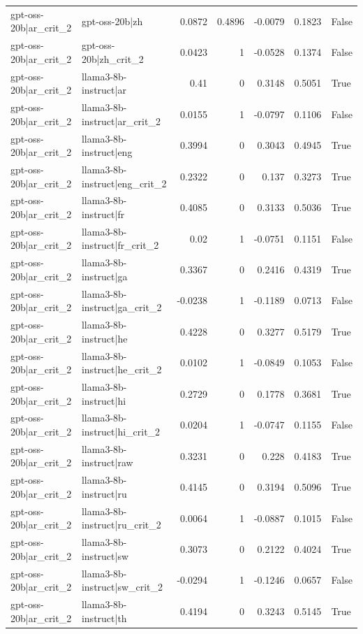 \begin{table}
\begin{tabular}{l l r r r r l}
gpt-oss-20b|ar_crit_2 & gpt-oss-20b|zh & 0.0872 & 0.4896 & -0.0079 & 0.1823 & False \\
gpt-oss-20b|ar_crit_2 & gpt-oss-20b|zh_crit_2 & 0.0423 & 1 & -0.0528 & 0.1374 & False \\
gpt-oss-20b|ar_crit_2 & llama3-8b-instruct|ar & 0.41 & 0 & 0.3148 & 0.5051 & True \\
gpt-oss-20b|ar_crit_2 & llama3-8b-instruct|ar_crit_2 & 0.0155 & 1 & -0.0797 & 0.1106 & False \\
gpt-oss-20b|ar_crit_2 & llama3-8b-instruct|eng & 0.3994 & 0 & 0.3043 & 0.4945 & True \\
gpt-oss-20b|ar_crit_2 & llama3-8b-instruct|eng_crit_2 & 0.2322 & 0 & 0.137 & 0.3273 & True \\
gpt-oss-20b|ar_crit_2 & llama3-8b-instruct|fr & 0.4085 & 0 & 0.3133 & 0.5036 & True \\
gpt-oss-20b|ar_crit_2 & llama3-8b-instruct|fr_crit_2 & 0.02 & 1 & -0.0751 & 0.1151 & False \\
gpt-oss-20b|ar_crit_2 & llama3-8b-instruct|ga & 0.3367 & 0 & 0.2416 & 0.4319 & True \\
gpt-oss-20b|ar_crit_2 & llama3-8b-instruct|ga_crit_2 & -0.0238 & 1 & -0.1189 & 0.0713 & False \\
gpt-oss-20b|ar_crit_2 & llama3-8b-instruct|he & 0.4228 & 0 & 0.3277 & 0.5179 & True \\
gpt-oss-20b|ar_crit_2 & llama3-8b-instruct|he_crit_2 & 0.0102 & 1 & -0.0849 & 0.1053 & False \\
gpt-oss-20b|ar_crit_2 & llama3-8b-instruct|hi & 0.2729 & 0 & 0.1778 & 0.3681 & True \\
gpt-oss-20b|ar_crit_2 & llama3-8b-instruct|hi_crit_2 & 0.0204 & 1 & -0.0747 & 0.1155 & False \\
gpt-oss-20b|ar_crit_2 & llama3-8b-instruct|raw & 0.3231 & 0 & 0.228 & 0.4183 & True \\
gpt-oss-20b|ar_crit_2 & llama3-8b-instruct|ru & 0.4145 & 0 & 0.3194 & 0.5096 & True \\
gpt-oss-20b|ar_crit_2 & llama3-8b-instruct|ru_crit_2 & 0.0064 & 1 & -0.0887 & 0.1015 & False \\
gpt-oss-20b|ar_crit_2 & llama3-8b-instruct|sw & 0.3073 & 0 & 0.2122 & 0.4024 & True \\
gpt-oss-20b|ar_crit_2 & llama3-8b-instruct|sw_crit_2 & -0.0294 & 1 & -0.1246 & 0.0657 & False \\
gpt-oss-20b|ar_crit_2 & llama3-8b-instruct|th & 0.4194 & 0 & 0.3243 & 0.5145 & True \\

\end{tabular}
\end{table}
